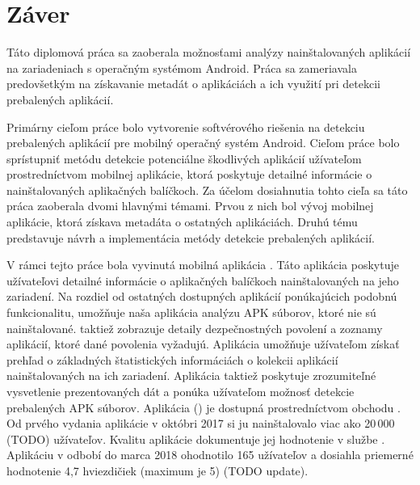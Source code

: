 \chapter{Záver}
Táto diplomová práca sa zaoberala možnosťami analýzy nainštalovaných aplikácií na zariadeniach s operačným systémom Android. Práca sa zameriavala predovšetkým na získavanie metadát o aplikáciách a ich využití pri detekcii prebalených aplikácií.

Primárny cieľom práce bolo vytvorenie softvérového riešenia na detekciu prebalených aplikácií pre mobilný operačný systém Android. Cieľom práce bolo sprístupniť metódu detekcie potenciálne škodlivých aplikácií užívateľom prostredníctvom mobilnej aplikácie, ktorá poskytuje detailné informácie o nainštalovaných aplikačných balíčkoch.  
Za účelom dosiahnutia tohto cieľa sa táto práca zaoberala dvomi hlavnými témami. Prvou z nich bol vývoj mobilnej aplikácie, ktorá získava metadáta o ostatných aplikáciách. Druhú tému predstavuje návrh a implementácia metódy detekcie prebalených aplikácií. 

V rámci tejto práce bola vyvinutá mobilná aplikácia . Táto aplikácia poskytuje užívateľovi detailné informácie o aplikačných balíčkoch nainštalovaných na jeho zariadení. Na rozdiel od ostatných dostupných aplikácií ponúkajúcich podobnú funkcionalitu, umožňuje naša aplikácia analýzu APK súborov, ktoré nie sú nainštalované. taktiež zobrazuje detaily dezpečnostných povolení a zoznamy aplikácií, ktoré dané povolenia vyžadujú. Aplikácia umožňuje užívateľom získať prehľad o základných štatistických informáciách o kolekcii aplikácií nainštalovaných na ich zariadení. Aplikácia taktiež poskytuje zrozumiteľné vysvetlenie prezentovaných dát a ponúka užívateľom možnosť detekcie prebalených APK súborov.  Aplikácia  () je dostupná prostredníctvom obchodu . Od prvého vydania aplikácie v októbri 2017 si ju nainštalovalo viac ako 20\,000 (TODO) užívateľov. Kvalitu aplikácie dokumentuje jej hodnotenie v službe . Aplikáciu v odbobí do marca 2018 ohodnotilo 165 užívateľov a dosiahla priemerné hodnotenie 4,7 hviezdičiek (maximum je 5) (TODO update).

